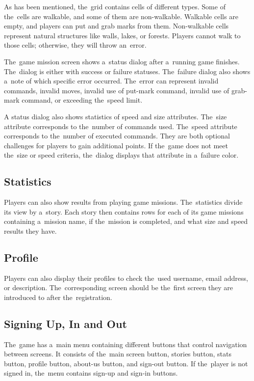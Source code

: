 As has been mentioned, the~grid contains cells of different types.
Some of the~cells are walkable, and some of them are non-walkable.
Walkable cells are empty, and players can put and grab marks from them.
Non-walkable cells represent natural structures like walls, lakes, or forests.
Players cannot walk to those cells; otherwise, they will throw an~error.

The~game mission screen shows a~status dialog after a~running game finishes.
The~dialog is either with success or failure statuses.
The~failure dialog also shows a~note of which specific error occurred.
The~error can represent invalid commands, invalid moves, invalid use of put-mark command, invalid use of grab-mark command, or exceeding the~speed limit.

A status dialog also shows statistics of speed and size attributes.
The~size attribute corresponds to the~number of commands used.
The~speed attribute corresponds to the~number of executed commands.
They are both optional challenges for players to gain additional points.
If the~game does not meet the~size or speed criteria, the~dialog displays that attribute in a~failure color.

\subsection{Statistics}
\label{analysis:game:statistics}

Players can also show results from playing game missions.
The~statistics divide its view by a~story.
Each story then contains rows for each of its game missions containing a~mission name, if the~mission is completed, and what size and speed results they have.

\subsection{Profile}
\label{analysis:game:profile}

Players can also display their profiles to check the~used username, email address, or description.
The~corresponding screen should be the~first screen they are introduced to after the~registration.

\subsection{Signing Up, In and Out}
\label{analysis:game:sign-up-in-out}

The~game has a~main menu containing different buttons that control navigation between screens.
It consists of the~main screen button, stories button, stats button, profile button, about-us button, and sign-out button.
If the~player is not signed in, the~menu contains sign-up and sign-in buttons.

